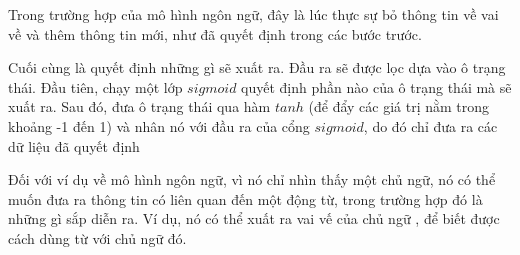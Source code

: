 Trong trường hợp của mô hình ngôn ngữ, đây là lúc thực sự bỏ thông tin về vai về và thêm thông tin mới, như đã quyết định trong các bước trước.
\begin{figure}[!htb]
\end{figure}
Cuối cùng là quyết định những gì sẽ xuất ra. Đầu ra sẽ được lọc dựa vào ô trạng thái. Đầu tiên, chạy một lớp
\(sigmoid\) quyết định phần nào của ô trạng thái mà sẽ xuất ra. Sau đó, đưa ô trạng thái qua hàm
\(tanh\) (để đẩy các giá trị nằm trong khoảng -1 đến 1) và nhân nó với đầu ra của cổng \(sigmoid\), do đó chỉ đưa ra
các dữ liệu đã quyết định

Đối với ví dụ về mô hình ngôn ngữ, vì nó chỉ nhìn thấy một chủ ngữ, nó có thể muốn đưa ra thông tin có liên quan đến
một động từ, trong trường hợp đó là những gì sắp diễn ra. Ví dụ, nó có thể xuất ra vai vế của chủ ngữ , để biết được
cách dùng từ với chủ ngữ đó.